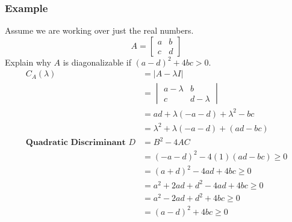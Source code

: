 \documentclass{math}
\begin{document}
\subsubsection*{Example}
Assume we are working over just the real numbers.
\[ A = \begin{bmatrix}a & b \\ c & d\end{bmatrix} \]
Explain why \( A \) is diagonalizable if \( (a-d)^2+4bc>0 \).
\begin{align*}
  C_A(\lambda) &= |A-\lambda I| \\
  &= \begin{vmatrix}
    a-\lambda & b \\
    c & d-\lambda
  \end{vmatrix} \\
  &= ad+\lambda(-a-d)+\lambda^2-bc \\
  &= \lambda^2+\lambda(-a-d)+(ad-bc) \\
  \textbf{Quadratic Discriminant } D &= B^2-4AC \\
  &= (-a-d)^2-4(1)(ad-bc) \ge 0 \\
  &= (a+d)^2-4ad+4bc \ge 0 \\
  &= a^2+2ad+d^2-4ad+4bc \ge 0 \\
  &= a^2-2ad+d^2+4bc \ge 0 \\
  &= (a-d)^2+4bc \ge 0
\end{align*}
\end{document}
